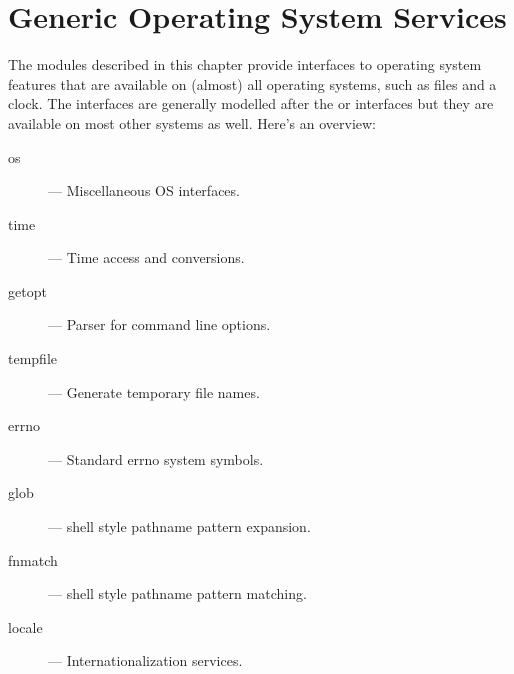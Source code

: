 \chapter{Generic Operating System Services}
\label{allos}

The modules described in this chapter provide interfaces to operating
system features that are available on (almost) all operating systems,
such as files and a clock.  The interfaces are generally modelled
after the \UNIX{} or \C{} interfaces but they are available on most
other systems as well.  Here's an overview:

\begin{description}

\item[os]
--- Miscellaneous OS interfaces.

\item[time]
--- Time access and conversions.

\item[getopt]
--- Parser for command line options.

\item[tempfile]
--- Generate temporary file names.

\item[errno]
--- Standard errno system symbols.

\item[glob]
--- \UNIX{} shell style pathname pattern expansion.

\item[fnmatch]
--- \UNIX{} shell style pathname pattern matching.

\item[locale]
--- Internationalization services.

\end{description}

